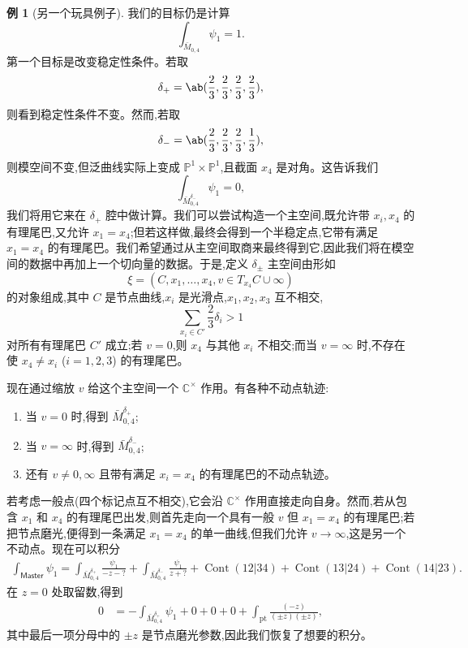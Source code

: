 \documentclass{amsart}
\theoremstyle{definition}
\newtheorem{exm}[thm]{例}
\theoremstyle{remark}
\theoremstyle{plain}
\theoremstyle{definition}
\theoremstyle{remark}
\newcommand{\C}{\mathbb{C}}
\renewcommand{\P}{\mathbb{P}}
\newcommand{\mr}[1]{\mathrm{#1}}
\newcommand{\on}[1]{\operatorname{#1}}
\newcommand{\ms}[1]{\mathsf{#1}}
\newcommand{\1}{\mathbf{1}}
\newcommand{\2}{\mathbf{2}}
\newcommand{\3}{\mathbf{3}}
\begin{document}
\begin{exm}[另一个玩具例子]
    我们的目标仍是计算
    \[ \int_{\bar{M}_{0,4}} \psi_1 = 1. \]
    第一个目标是改变稳定性条件。若取
    \[ \delta_+ = \ab(\frac{2}{3}, \frac{2}{3}, \frac{2}{3}, \frac{2}{3}), \]
    则看到稳定性条件不变。然而,若取
    \[ \delta_- = \ab(\frac{2}{3}, \frac{2}{3}, \frac{2}{3}, \frac{1}{3}), \]
    则模空间不变,但泛曲线实际上变成 \(\P^1 \times \P^1\),且截面 \(x_4\) 是对角。这告诉我们
    \[ \int_{\bar{M}_{0,4}^{\delta_-}} \psi_1 = 0, \]
    我们将用它来在 \(\delta_+\) 腔中做计算。我们可以尝试构造一个主空间,既允许带 \(x_i, x_4\) 的有理尾巴,又允许 \(x_1 = x_4\);但若这样做,最终会得到一个半稳定点,它带有满足 \(x_1 = x_4\) 的有理尾巴。我们希望通过从主空间取商来最终得到它,因此我们将在模空间的数据中再加上一个切向量的数据。于是,定义 \(\delta_{\pm}\) 主空间由形如
    \[ \xi = (C, x_1, \ldots, x_4, v \in T_{x_4} C \cup \infty) \]
    的对象组成,其中 \(C\) 是节点曲线,\(x_i\) 是光滑点,\(x_1, x_2, x_3\) 互不相交,
    \[ \sum_{x_i \in C'} \frac{2}{3} \delta_i > 1 \]
    对所有有理尾巴 \(C'\) 成立;若 \(v = 0\),则 \(x_4\) 与其他 \(x_i\) 不相交;而当 \(v = \infty\) 时,不存在使 \(x_4 \neq x_i\) (\(i = 1,2,3\)) 的有理尾巴。

    现在通过缩放 \(v\) 给这个主空间一个 \(\C^{\times}\) 作用。有各种不动点轨迹:
    \begin{enumerate}
        \item 当 \(v = 0\) 时,得到 \(\bar{M}_{0,4}^{\delta_+}\);
        \item 当 \(v = \infty\) 时,得到 \(\bar{M}_{0,4}^{\delta_-}\);
        \item 还有 \(v \neq 0,\infty\) 且带有满足 \(x_i = x_4\) 的有理尾巴的不动点轨迹。
    \end{enumerate}

    若考虑一般点(四个标记点互不相交),它会沿 \(\C^{\times}\) 作用直接走向自身。然而,若从包含 \(x_1\) 和 \(x_4\) 的有理尾巴出发,则首先走向一个具有一般 \(v\) 但 \(x_1 = x_4\) 的有理尾巴;若把节点磨光,便得到一条满足 \(x_1 = x_4\) 的单一曲线,但我们允许 \(v \to \infty\),这是另一个不动点。现在可以积分
    \begin{align*}
        \int_{\ms{Master}} \psi_1 = \int_{\bar{M}_{0,4}^{\delta_+}} \frac{\psi_1}{-z-?} + \int_{\bar{M}_{0,4}^{\delta_-}} \frac{\psi_1}{z+?} + \on{Cont}(12|34) + \on{Cont}(13|24) + \on{Cont}(14|23).
    \end{align*}
    在 \(z = 0\) 处取留数,得到
    \begin{align*}
        0 &= - \int_{\bar{M}_{0,4}^{\delta_+}} \psi_1 + 0 + 0 + 0 + \int_{\mr{pt}} \frac{(-z)}{(\pm z)(\pm z)},
    \end{align*}
    其中最后一项分母中的 \(\pm z\) 是节点磨光参数,因此我们恢复了想要的积分。
\end{exm}
\end{document}
